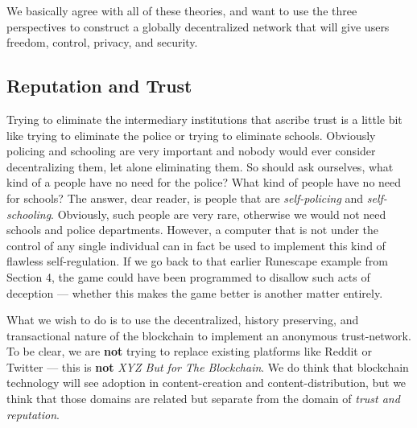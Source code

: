 \documentclass[a4paper]{article}
\begin{document}
We basically agree with all of these theories, and want to use the three perspectives to construct a globally decentralized network that will give users freedom, control, privacy, and security.
\subsection{Reputation and Trust}
\label{Reputation and Trust}

Trying to eliminate the intermediary institutions that ascribe trust is a little bit like trying to eliminate the police or trying to eliminate schools. Obviously policing and schooling are very important and nobody would ever consider decentralizing them, let alone eliminating them. So should ask ourselves, what kind of a people have no need for the police? What kind of people have no need for schools? The answer, dear reader, is people that are \emph{self-policing} and \emph{self-schooling}. Obviously, such people are very rare, otherwise we would not need schools and police departments. However, a computer that is not under the control of any single individual can in fact be used to implement this kind of flawless self-regulation. If we go back to that earlier Runescape example from Section 4, the game could have been programmed to disallow such acts of deception ---  whether this makes the game better is another matter entirely.

What we wish to do is to use the decentralized, history preserving, and transactional nature of the blockchain to implement an anonymous trust-network. To be clear, we are \textbf{not} trying to replace existing platforms like Reddit or Twitter ---  this is \textbf{not} \emph{XYZ But for The Blockchain}. We do think that blockchain technology will see adoption in content-creation and content-distribution, but we think that those domains are related but separate from the domain of \emph{trust and reputation}.
\end{document}
